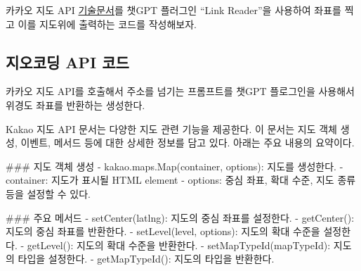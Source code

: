 \documentclass[
  letterpaper,
]{book}
\newenvironment{Shaded}{\begin{snugshade}}{\end{snugshade}}
\newcommand{\FunctionTok}[1]{\textcolor[rgb]{0.28,0.35,0.67}{#1}}
\newcommand{\InformationTok}[1]{\textcolor[rgb]{0.37,0.37,0.37}{#1}}
\newcommand{\NormalTok}[1]{\textcolor[rgb]{0.00,0.23,0.31}{#1}}
\newcommand{\SpecialStringTok}[1]{\textcolor[rgb]{0.13,0.47,0.30}{#1}}
\begin{document}
카카오 지도 API
\href{https://apis.map.kakao.com/web/documentation/}{기술문서}를 챗GPT
플러그인 ``Link Reader''을 사용하여 좌표를 찍고 이를 지도위에 출력하는
코드를 작성해보자.

\hypertarget{uxc9c0uxc624uxcf54uxb529-api-uxcf54uxb4dc}{%
\subsection{지오코딩 API
코드}\label{uxc9c0uxc624uxcf54uxb529-api-uxcf54uxb4dc}}

카카오 지도 API를 호출해서 주소를 넘기는 프롬프트를 챗GPT 플로그인을
사용해서 위경도 좌표를 반환하는 생성한다.

\begin{tcolorbox}[enhanced jigsaw, opacityback=0, opacitybacktitle=0.6, colback=white, rightrule=.15mm, coltitle=black, colframe=quarto-callout-note-color-frame, colbacktitle=quarto-callout-note-color!10!white, bottomrule=.15mm, bottomtitle=1mm, breakable, title=\textcolor{quarto-callout-note-color}{\faInfo}\hspace{0.5em}{웹사이트를 읽고 다음 지령을 준비해
https://apis.map.kakao.com/web/documentation/}, titlerule=0mm, leftrule=.75mm, toptitle=1mm, left=2mm, arc=.35mm, toprule=.15mm]

\begin{Shaded}
\begin{Highlighting}[]
\NormalTok{Kakao 지도 API 문서는 다양한 지도 관련 기능을 제공한다. 이 문서는 지도 객체 생성, 이벤트, 메서드 등에 대한 상세한 정보를 담고 있다. 아래는 주요 내용의 요약이다.}

\FunctionTok{\#\#\# 지도 객체 생성}
\SpecialStringTok{{-} }\InformationTok{\textasciigrave{}kakao.maps.Map(container, options)\textasciigrave{}}\NormalTok{: 지도를 생성한다.}
\SpecialStringTok{  {-} }\InformationTok{\textasciigrave{}container\textasciigrave{}}\NormalTok{: 지도가 표시될 HTML element}
\SpecialStringTok{  {-} }\InformationTok{\textasciigrave{}options\textasciigrave{}}\NormalTok{: 중심 좌표, 확대 수준, 지도 종류 등을 설정할 수 있다.}

\FunctionTok{\#\#\# 주요 메서드}
\SpecialStringTok{{-} }\InformationTok{\textasciigrave{}setCenter(latlng)\textasciigrave{}}\NormalTok{: 지도의 중심 좌표를 설정한다.}
\SpecialStringTok{{-} }\InformationTok{\textasciigrave{}getCenter()\textasciigrave{}}\NormalTok{: 지도의 중심 좌표를 반환한다.}
\SpecialStringTok{{-} }\InformationTok{\textasciigrave{}setLevel(level, options)\textasciigrave{}}\NormalTok{: 지도의 확대 수준을 설정한다.}
\SpecialStringTok{{-} }\InformationTok{\textasciigrave{}getLevel()\textasciigrave{}}\NormalTok{: 지도의 확대 수준을 반환한다.}
\SpecialStringTok{{-} }\InformationTok{\textasciigrave{}setMapTypeId(mapTypeId)\textasciigrave{}}\NormalTok{: 지도의 타입을 설정한다.}
\SpecialStringTok{{-} }\InformationTok{\textasciigrave{}getMapTypeId()\textasciigrave{}}\NormalTok{: 지도의 타입을 반환한다.}


\end{Highlighting}
\end{Shaded}
\end{tcolorbox}
\end{document}
